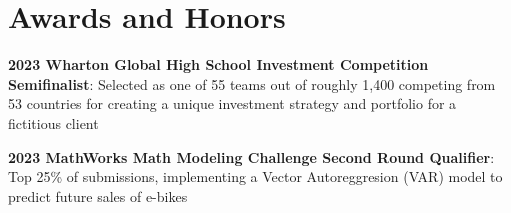 \documentclass[letterpaper,11pt]{article}
\begin{document}
\section{Awards and Honors}
    \begin{itemize}[leftmargin=0.15in, label={}]
        \small{
            \item{\textbf{2023 Wharton Global High School Investment Competition Semifinalist}{: Selected as one of 55 teams out of roughly 1,400 competing from 53 countries for creating a unique investment strategy and portfolio for a fictitious client}}
            \item{\textbf{2023 MathWorks Math Modeling Challenge Second Round Qualifier}{: Top 25\% of submissions, implementing a Vector Autoreggresion (VAR) model to predict future sales of e-bikes}}
        }
 \end{itemize}
\end{document}
